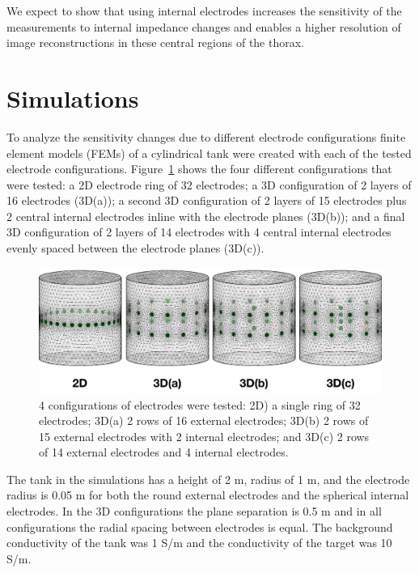 We expect to show that using internal electrodes increases the sensitivity of the measurements to internal impedance changes 
and enables a higher resolution of image reconstructions in these central regions of the thorax. 

\section{Simulations}
To analyze the sensitivity changes due to different electrode 
configurations finite element models (FEMs) of a cylindrical tank were 
created with each of the tested electrode configurations. Figure~\ref{fig:tank_FEM} shows the four 
different configurations that were tested: a 2D 
electrode ring of 32 electrodes; a 3D configuration of 2 layers of 16 
electrodes (3D(a)); a second 3D configuration of 2 layers of 15 electrodes 
plus 2 central internal electrodes inline with the electrode planes (3D(b)); and a final 3D configuration of 
2 layers of 14 electrodes with 4 central internal electrodes evenly spaced between the electrode planes (3D(c)).

\begin{figure}
\centering
\includegraphics[width=\textwidth]{chapter6-internal_electrodes/imgs/FEM_Comparison.pdf}
\caption[Internal electrode configurations]{4 configurations of electrodes were tested: 2D) a single ring of 32 electrodes; 
	3D(a) 2 rows of 16 external electrodes; 3D(b) 2 rows of 15 external electrodes with 2 internal electrodes; and 3D(c) 2 rows 
of 14 external electrodes and 4 internal electrodes.}
\label{fig:tank_FEM}
\end{figure}

The tank in the simulations has a height of 2 m, radius of 1 m, and the electrode radius
is 0.05 m for both the round external electrodes and the spherical internal electrodes.
In the 3D configurations the plane separation is 0.5 m and in all configurations the radial
spacing between electrodes is equal.
The background conductivity of the tank was 1 S/m and the conductivity of the target was
10 S/m.

